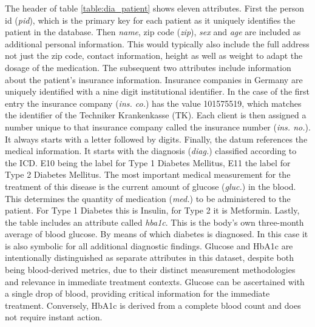 The header of table \ref{table:dia_patient} shows eleven attributes. First the person id (\textit{pid}), which is the primary key for each patient as it uniquely identifies the patient in the database. Then \textit{name}, zip code (\textit{zip}), \textit{sex} and \textit{age} are included as additional personal information.
This would typically also include the full address not just the zip code, contact information, height as well as weight to adapt the dosage of the medication. The subsequent two attributes include information about the patient's insurance information. 
Insurance companies in Germany are uniquely identified with a nine digit institutional identifier. In the case of the first entry the insurance company (\textit{ins. co.}) has the value 101575519, which matches the identifier of the Techniker Krankenkasse (TK). 
Each client is then assigned a number unique to that insurance company called the insurance number (\textit{ins. no.}). It always starts with a letter followed by digits. Finally, the datum references the medical information. It starts with the diagnosis (\textit{diag.}) classified according to the \ac*{ICD}. 
E10 being the label for Type 1 Diabetes Mellitus, E11 the label for Type 2 Diabetes Mellitus. The most important medical measurement for the treatment of this disease is the current amount of glucose (\textit{gluc.}) in the blood. This determines the quantity of medication (\textit{med.}) to be administered to the patient. For Type 1 Diabetes this is Insulin, for Type 2 it is Metformin. 
Lastly, the table includes an attribute called \textit{hba1c}. This is the body's own three-month average of blood glucose. By means of which diabetes is diagnosed. In this case it is also symbolic for all additional diagnostic findings. 
Glucose and HbA1c are intentionally distinguished as separate attributes in this dataset, despite both being blood-derived metrics, due to their distinct measurement methodologies and relevance in immediate treatment contexts. Glucose can be ascertained with a single drop of blood, providing critical information for the immediate treatment.
Conversely, HbA1c is derived from a complete blood count and does not require instant action. \newline

